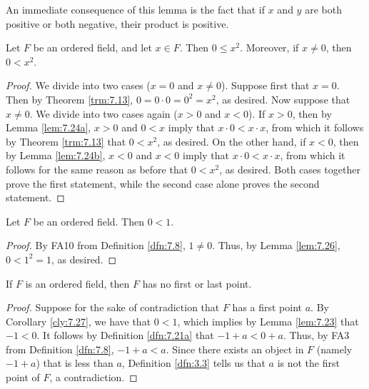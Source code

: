 \documentclass[../main.tex]{subfiles}
\begin{document}
\begin{remark}\label{rmk:7.25}
    An immediate consequence of this lemma is the fact that if $x$ and $y$ are both positive or both negative, their product is positive.
\end{remark}

\begin{lemma}\label{lem:7.26}
    Let $F$ be an ordered field, and let $x\in F$. Then $0\leq x^2$. Moreover, if $x\neq 0$, then $0<x^2$.
    \begin{proof}
        We divide into two cases ($x=0$ and $x\neq 0$). Suppose first that $x=0$. Then by Theorem \ref{trm:7.13}, $0=0\cdot 0=0^2=x^2$, as desired. Now suppose that $x\neq 0$. We divide into two cases again ($x>0$ and $x<0$). If $x>0$, then by Lemma \ref{lem:7.24a}, $x>0$ and $0<x$ imply that $x\cdot 0<x\cdot x$, from which it follows by Theorem \ref{trm:7.13} that $0<x^2$, as desired. On the other hand, if $x<0$, then by Lemma \ref{lem:7.24b}, $x<0$ and $x<0$ imply that $x\cdot 0<x\cdot x$, from which it follows for the same reason as before that $0<x^2$, as desired. Both cases together prove the first statement, while the second case alone proves the second statement.
    \end{proof}
\end{lemma}

\begin{corollary}\label{cly:7.27}
    Let $F$ be an ordered field. Then $0<1$.
    \begin{proof}
        By FA10 from Definition \ref{dfn:7.8}, $1\neq 0$. Thus, by Lemma \ref{lem:7.26}, $0<1^2=1$, as desired.
    \end{proof}
\end{corollary}

\begin{theorem}\label{trm:7.28}
    If $F$ is an ordered field, then $F$ has no first or last point.
    \begin{proof}
        Suppose for the sake of contradiction that $F$ has a first point $a$. By Corollary \ref{cly:7.27}, we have that $0<1$, which implies by Lemma \ref{lem:7.23} that $-1<0$. It follows by Definition \ref{dfn:7.21a} that $-1+a<0+a$. Thus, by FA3 from Definition \ref{dfn:7.8}, $-1+a<a$. Since there exists an object in $F$ (namely $-1+a$) that is less than $a$, Definition \ref{dfn:3.3} tells us that $a$ is not the first point of $F$, a contradiction.
    \end{proof}
\end{theorem}
\pagebreak
\end{document}
